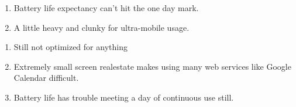 \documentclass[letterpaper]{article}
\begin{document}
{\begin{enumerate}
\end{enumerate}

\newpage


\begin{enumerate}

\item Battery life expectancy can't hit the one day mark.

\item A little heavy and clunky for ultra-mobile usage.

\end{enumerate}

\newpage


\begin{enumerate}

\item Still not optimized for anything

\item Extremely small screen realestate makes using many web services like
  Google Calendar difficult.

\item Battery life has trouble meeting a day of continuous use still.

\end{enumerate}

}
\end{document}
